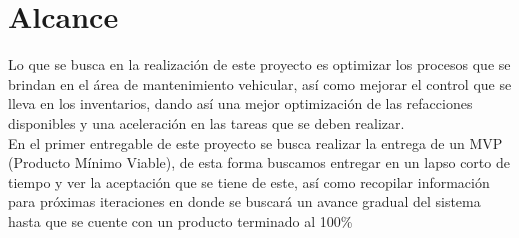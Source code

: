 \section{Alcance}
Lo que se busca en la realización de este proyecto es optimizar los procesos que se brindan en el área de mantenimiento vehicular, así como mejorar el control que se lleva en los inventarios, dando así   una mejor optimización de las refacciones disponibles y una aceleración en las tareas que se deben realizar.
\\
En el primer entregable de este proyecto se busca realizar la entrega de un MVP (Producto Mínimo Viable), de esta forma buscamos entregar en un lapso corto de tiempo y ver la aceptación que se tiene de este, así como recopilar información para próximas iteraciones en donde se buscará un avance gradual del sistema hasta que se cuente con un producto terminado al 100\%
